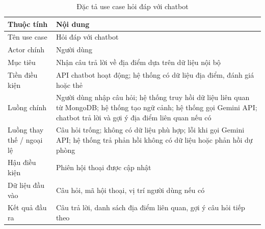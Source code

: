 ﻿\documentclass[../DoAn.tex]{subfiles}
\begin{document}
\begin{table}[H]
\centering
\caption{Đặc tả use case hỏi đáp với chatbot}
\label{tab:uc-chatbot}
\small
\renewcommand{\arraystretch}{1.15}
\setlength{\tabcolsep}{4pt}
\begin{tabularx}{\textwidth}{|L{3.4cm}|Y|}
\hline
\textbf{Thuộc tính} & \textbf{Nội dung} \\
\hline
Tên use case & Hỏi đáp với chatbot \\
\hline
Actor chính & Người dùng \\
\hline
Mục tiêu & Nhận câu trả lời về địa điểm dựa trên dữ liệu nội bộ \\
\hline
Tiền điều kiện & API chatbot hoạt động; hệ thống có dữ liệu địa điểm, đánh giá hoặc thẻ \\
\hline
Luồng chính & Người dùng nhập câu hỏi; hệ thống truy hồi dữ liệu liên quan từ MongoDB; hệ thống tạo ngữ cảnh; hệ thống gọi Gemini API; chatbot trả lời và gợi ý địa điểm liên quan nếu có \\
\hline
Luồng thay thế / ngoại lệ & Câu hỏi trống; không có dữ liệu phù hợp; lỗi khi gọi Gemini API; hệ thống trả phản hồi không có dữ liệu hoặc phản hồi dự phòng \\
\hline
Hậu điều kiện & Phiên hội thoại được cập nhật \\
\hline
Dữ liệu đầu vào & Câu hỏi, mã hội thoại, vị trí người dùng nếu có \\
\hline
Kết quả đầu ra & Câu trả lời, danh sách địa điểm liên quan, gợi ý câu hỏi tiếp theo \\
\hline
\end{tabularx}
\end{table}
\end{document}
